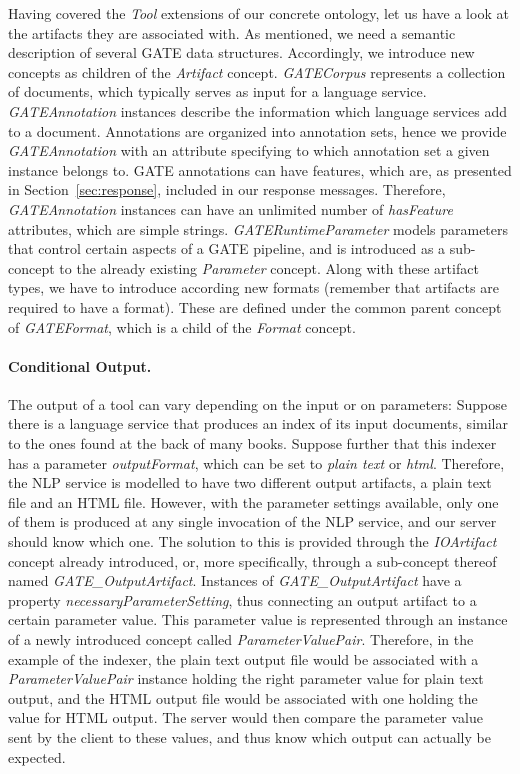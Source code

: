Having covered the \emph{Tool} extensions of our concrete ontology,
let us have a look at the artifacts they are associated with. As
mentioned, we need a semantic description of several GATE data
structures. Accordingly, we introduce new concepts as children of the
\emph{Artifact} concept. \emph{GATECorpus} represents a collection of
documents, which typically serves as input for a language service.
\emph{GATEAnnotation} instances describe the information which
language services add to a document. Annotations are organized into
annotation sets, hence we provide \emph{GATEAnnotation} with an
attribute specifying to which annotation set a given instance belongs
to. GATE annotations can have features, which are, as presented in
Section~\ref{sec:response}, included in our response
messages. Therefore, \emph{GATEAnnotation} instances can have an
unlimited number of \emph{hasFeature} attributes, which are simple
strings. \emph{GATERuntimeParameter} models parameters that control
certain aspects of a GATE pipeline, and is introduced as a sub-concept
to the already existing \emph{Parameter} concept. Along with these
artifact types, we have to introduce according new formats (remember
that artifacts are required to have a format). These are defined under
the common parent concept of \emph{GATEFormat}, which is a child of
the \emph{Format} concept.

\paragraph{Conditional Output.} The output of a tool can vary
depending on the input or on parameters: Suppose there is a language
service that produces an index of its input documents, similar to the
ones found at the back of many books.  Suppose further that this
indexer has a parameter \emph{outputFormat}, which can be set to
\emph{plain text} or \emph{html}. Therefore, the NLP service is
modelled to have two different output artifacts, a plain text file and
an HTML file. However, with the parameter settings available, only one
of them is produced at any single invocation of the NLP service, and
our server should know which one. The solution to this is provided
through the \emph{IOArtifact} concept already introduced, or, more
specifically, through a sub-concept thereof named
\emph{GATE\_OutputArtifact}.  Instances of \emph{GATE\_OutputArtifact}
have a property \emph{necessaryParameterSetting}, thus connecting an
output artifact to a certain parameter value. This parameter value is
represented through an instance of a newly introduced concept called
\emph{ParameterValuePair}. Therefore, in the example of the indexer, the
plain text output file would be associated with a
\emph{ParameterValuePair} instance holding the right parameter value
for plain text output, and the HTML output file would be associated
with one holding the value for HTML output. The server would then
compare the parameter value sent by the client to these values, and
thus know which output can actually be expected.


